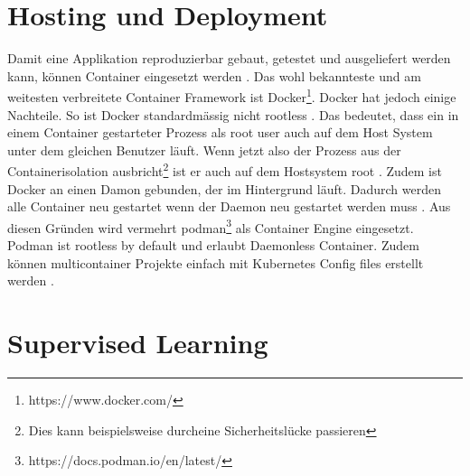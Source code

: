 %

\section{Hosting und Deployment}
\label{state:deployment}


Damit eine Applikation reproduzierbar
gebaut, getestet und ausgeliefert werden kann, können Container eingesetzt werden \parencite{what-is-a-container}.
Das wohl bekannteste und am weitesten verbreitete Container Framework
ist Docker\footnote{https://www.docker.com/}. Docker hat jedoch einige Nachteile.
So ist Docker standardmässig nicht rootless \parencite{docker:rootless}.
Das bedeutet, dass ein in einem Container gestarteter Prozess als root user
auch auf dem Host System unter dem gleichen Benutzer läuft.
Wenn jetzt also
der Prozess aus der Containerisolation ausbricht\footnote{Dies kann beispielsweise durcheine Sicherheitslücke passieren}
ist er auch auf dem Hostsystem root \parencite{so_2020}.
Zudem ist Docker an einen Damon gebunden, der im Hintergrund läuft.
Dadurch werden alle Container neu gestartet wenn der Daemon neu gestartet werden muss \parencite{docker:daemon}.
Aus diesen Gründen wird vermehrt podman\footnote{https://docs.podman.io/en/latest/}
als Container Engine eingesetzt.
Podman ist rootless by default und erlaubt Daemonless Container.
Zudem können multicontainer Projekte einfach mit Kubernetes Config files
erstellt werden \parencite{redhat:podman-pods}.

\section{Supervised Learning}
\label{state:supervised-learning}


